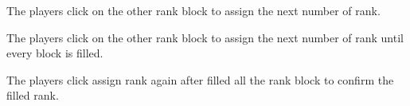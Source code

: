 \documentclass[12pt,oneside,openright,a4paper]{cpe-english-project}
\begin{document}
\begin{itemize}
\begin{enumerate}
		The players click on the other rank block to assign the next number of rank. \\
		\begin{minipage}[c]{\textwidth}\centering {}  \end{minipage}
		The players click on the other rank block to assign the next number of rank until every block is filled. \\
		\begin{minipage}[c]{\textwidth}\centering {}  \end{minipage}
		The players click assign rank again after filled all the rank block to confirm the filled rank. \\
		\begin{minipage}[c]{\textwidth}\centering {}  \end{minipage}

\end{enumerate}
\end{itemize}
\end{document}

